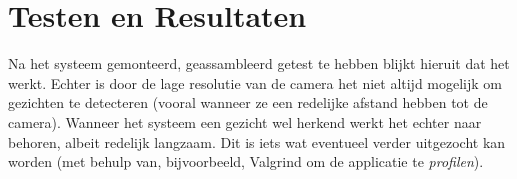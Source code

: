 \chapter{Testen en Resultaten}
\label{ch:testing}

Na het systeem gemonteerd, geassambleerd getest te hebben blijkt hieruit dat het
werkt. Echter is door de lage resolutie van de camera het niet altijd mogelijk
om gezichten te detecteren (vooral wanneer ze een redelijke afstand hebben
tot de camera). Wanneer het systeem een gezicht wel herkend werkt het echter
naar behoren, albeit redelijk langzaam. Dit is iets wat eventueel verder uitgezocht
kan worden (met behulp van, bijvoorbeeld, Valgrind om de applicatie te
\emph{profilen}).
